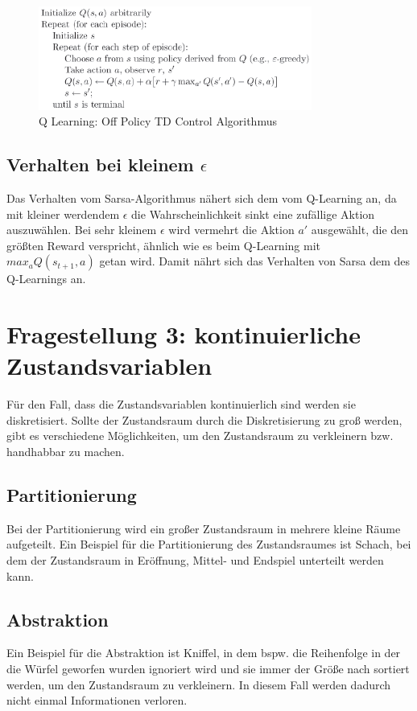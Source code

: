 \documentclass[10pt]{scrartcl}
\begin{document}
\begin{figure}[htbp]
	\centering	\includegraphics[width=0.8\textwidth]{Bilder/Q-Learning.png}
	\caption{Q Learning: Off Policy TD Control Algorithmus}
	\label{fig:QLearning}
\end{figure}


\subsection{Verhalten bei kleinem $\epsilon$}
Das Verhalten vom Sarsa-Algorithmus nähert sich dem vom Q-Learning an, da mit kleiner werdendem $\epsilon$ die Wahrscheinlichkeit sinkt eine zufällige Aktion auszuwählen. Bei sehr kleinem $\epsilon$ wird vermehrt die Aktion $a'$ ausgewählt, die den größten Reward verspricht, ähnlich wie es beim Q-Learning mit $max_{a} Q(s_{t+1},a)$ getan wird. Damit nährt sich das Verhalten von Sarsa dem des Q-Learnings an.

\section{Fragestellung 3: kontinuierliche Zustandsvariablen}
Für den Fall, dass die Zustandsvariablen kontinuierlich sind werden sie diskretisiert. Sollte der Zustandsraum durch die Diskretisierung zu groß werden, gibt es verschiedene Möglichkeiten, um den Zustandsraum zu verkleinern bzw. handhabbar zu machen.
\subsection{Partitionierung}
Bei der Partitionierung wird ein großer Zustandsraum in mehrere kleine Räume aufgeteilt. Ein Beispiel für die Partitionierung des Zustandsraumes ist Schach, bei dem der Zustandsraum in Eröffnung, Mittel- und Endspiel unterteilt werden kann. 

\subsection{Abstraktion}
Ein Beispiel für die Abstraktion ist Kniffel, in dem bspw. die Reihenfolge in der die Würfel geworfen wurden ignoriert wird und sie immer der Größe nach sortiert werden, um den Zustandsraum zu verkleinern. In diesem Fall werden dadurch nicht einmal Informationen verloren.
\end{document}

